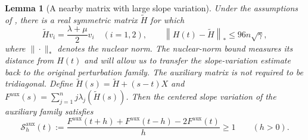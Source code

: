 \documentclass[10pt,a4paper]{article}
\newtheorem{lemma}{Lemma}[section]
\newcommand{\norm}[1]{\left\lVert #1\right\rVert}
\begin{document}
\begin{lemma}[A nearby matrix with large slope variation]
\label{lem:auxiliary}
Under the assumptions of , there is a real
symmetric matrix $\widetilde H$ for which
\begin{equation}\label{eq:auxiliary}
\boxed{\widetilde Hv_i=\frac{\lambda+\mu}{2}v_i\quad(i=1,2),
\qquad\norm{H(t)-\widetilde H}_*\leq96n\sqrt\gamma,}
\end{equation}
where $\|\cdot\|_*$ denotes the nuclear norm. 
The nuclear-norm bound measures its distance from
$H(t)$ and will allow us to transfer the slope-variation
estimate back to the original perturbation family. The auxiliary matrix is not required to be tridiagonal.
Define $\widetilde H(s)=\widetilde H+(s-t)X$ and
$F^{\mathrm{aux}}(s)=\sum_{j=1}^n j\lambda_j(\widetilde H(s))$.
Then the centered slope variation of the auxiliary family satisfies
\begin{equation}\label{eq:auxiliary-defect}
\boxed{\mathcal S_h^{\mathrm{aux}}(t)
:=\frac{F^{\mathrm{aux}}(t+h)+F^{\mathrm{aux}}(t-h)
-2F^{\mathrm{aux}}(t)}{h}\geq1\qquad(h>0).}
\end{equation}
\end{lemma}
\end{document}
